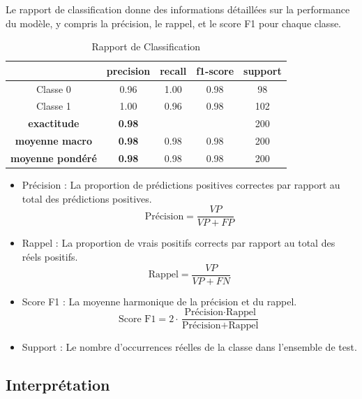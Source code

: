 \documentclass[12pt,a4paper,openay]{book}
\numberwithin{equation}{chapter}
\begin{document}
\begin{enumerate}
	 Le rapport de classification donne des informations d\'etaill\'ees sur la performance du mod\`ele, y compris la pr\'ecision, le rappel, et le score F1 pour chaque classe.
	\begin{table}[ht]
		\centering
		\begin{tabular}{|c|c|c|c|c|}
		   \hline
		   & precision & recall & f1-score & support \\
		   \hline
		   Classe 0 & 0.96 & 1.00 & 0.98 & 98 \\
		   Classe 1 & 1.00 & 0.96 & 0.98 & 102 \\
		   \hline
		   \textbf{exactitude} & \textbf{0.98} & & & 200 \\
		   \textbf{moyenne macro} & \textbf{0.98} & 0.98 & 0.98 & 200 \\
		   \textbf{moyenne pondéré} & \textbf{0.98} & 0.98 & 0.98 & 200 \\
		   \hline
		\end{tabular}
		\caption{Rapport de Classification}
	\end{table}
	 \begin{itemize}
	 \item Pr\'ecision : La proportion de pr\'edictions positives correctes par rapport au total des pr\'edictions positives.
	 	     \[
	 	     \text{Pr\'ecision} = \frac{VP}{VP + FP}
	 	     \]
	 	   \item Rappel : La proportion de vrais positifs corrects par rapport au total des r\'eels positifs.
	 	     \[
	 	     \text{Rappel} = \frac{VP}{VP + FN}
	 	     \]
	 	   \item Score F1 : La moyenne harmonique de la pr\'ecision et du rappel.
	 	     \[
	 	     \text{Score F1} = 2 \cdot \frac{\text{Pr\'ecision} \cdot \text{Rappel}}{\text{Pr\'ecision} + \text{Rappel}}
	 	     \]
	 	   \item  Support : Le nombre d'occurrences r\'eelles de la classe dans l'ensemble de test.
	 \end{itemize}
	

	
	\end{enumerate}
	
		\subsection*{Interpr\'etation}
		
\end{document}
